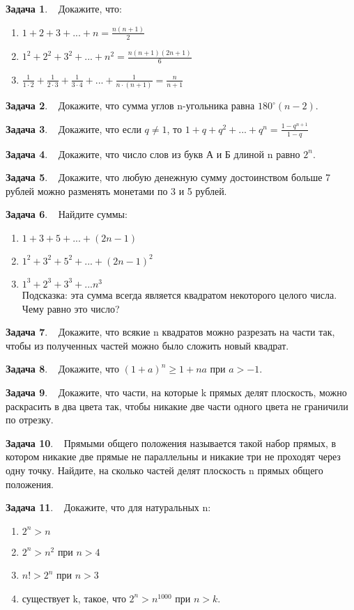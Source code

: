 \documentclass[12pt]{article}
\begin{document}
\theoremstyle{definition}
\newtheorem{zz}{Задача}
\newcommand{\problem}[1]{\begin{zz} $\ \ $ #1 \end{zz}}

\problem{ Докажите, что:
	\begin{enumerate}
	\item $1+2+3+...+n=\frac{n(n+1)}{2}$
	\item $1^2+2^2+3^2+...+n^2=\frac{n(n+1)(2n+1)}{6}$
	\item $\frac{1}{1\cdot 2}+\frac{1}{2\cdot 3}+\frac{1}{3\cdot 4}+...+\frac{1}{n\cdot (n+1)}=\frac{n}{n+1} $
	\end{enumerate}
}


\problem{
Докажите, что сумма углов n-угольника равна $180^{\circ}(n-2)$.
}

\problem{
Докажите, что если $q \ne 1$, то
$1+q+q^2+...+q^n=\frac{1-q^{n+1}}{1-q}$
}

\problem{
Докажите, что число слов из букв А и Б длиной n равно $2^n$.
}

\problem{
Докажите, что любую денежную сумму достоинством больше 7 рублей можно разменять монетами по 3 и 5 рублей.
}

\problem{
Найдите суммы:
\begin{enumerate}
\item $1+3+5+...+(2n-1)$
\item $1^2+3^2+5^2+...+(2n-1)^2$
\item $1^3+2^3+3^3+...n^3$\\ Подсказка: эта сумма всегда является квадратом некоторого целого числа. Чему равно это число?
\end{enumerate}
}
	
\problem{
Докажите, что всякие n квадратов можно разрезать на части так, чтобы из полученных частей можно было сложить новый квадрат.
}

\problem{
Докажите, что $(1+a)^n\ge 1+na$ при $a>-1$.
}
\problem{
Докажите, что части, на которые k прямых делят плоскость, можно раскрасить в два цвета так, чтобы никакие две части одного цвета не граничили по отрезку.
}

\problem{
Прямыми общего положения называется такой набор прямых, в котором никакие две прямые не параллельны и никакие три не проходят через одну точку. Найдите, на сколько частей делят плоскость n прямых общего положения.
}

\problem{
Докажите, что для натуральных n:
\begin{enumerate}
\item $2^n>n$
\item $2^n>n^2$ при $n>4$
\item $n!>2^n$ при $n>3$
\item существует k, такое, что $2^n>n^{1000}$ при $n>k$.
\end{enumerate}
}
\end{document}
